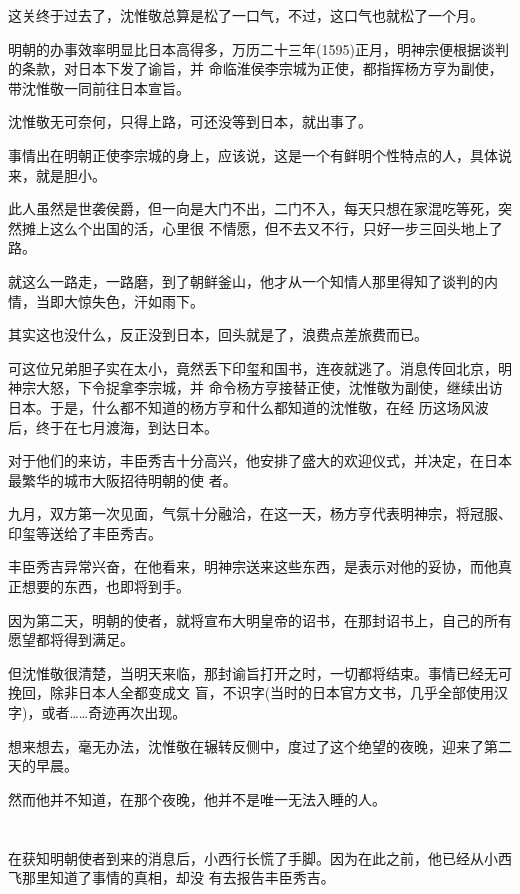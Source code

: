 \documentclass[11pt,a4paper,onecolumn]{article}
\begin{document}
这关终于过去了，沈惟敬总算是松了一口气，不过，这口气也就松了一个月。

明朝的办事效率明显比日本高得多，万历二十三年(1595)正月，明神宗便根据谈判的条款，对日本下发了谕旨，并
命临淮侯李宗城为正使，都指挥杨方亨为副使，带沈惟敬一同前往日本宣旨。

沈惟敬无可奈何，只得上路，可还没等到日本，就出事了。

事情出在明朝正使李宗城的身上，应该说，这是一个有鲜明个性特点的人，具体说来，就是胆小。

此人虽然是世袭侯爵，但一向是大门不出，二门不入，每天只想在家混吃等死，突然摊上这么个出国的活，心里很
不情愿，但不去又不行，只好一步三回头地上了路。

就这么一路走，一路磨，到了朝鲜釜山，他才从一个知情人那里得知了谈判的内情，当即大惊失色，汗如雨下。

其实这也没什么，反正没到日本，回头就是了，浪费点差旅费而已。

可这位兄弟胆子实在太小，竟然丢下印玺和国书，连夜就逃了。消息传回北京，明神宗大怒，下令捉拿李宗城，并
命令杨方亨接替正使，沈惟敬为副使，继续出访日本。于是，什么都不知道的杨方亨和什么都知道的沈惟敬，在经
历这场风波后，终于在七月渡海，到达日本。

对于他们的来访，丰臣秀吉十分高兴，他安排了盛大的欢迎仪式，并决定，在日本最繁华的城市大阪招待明朝的使
者。

九月，双方第一次见面，气氛十分融洽，在这一天，杨方亨代表明神宗，将冠服、印玺等送给了丰臣秀吉。

丰臣秀吉异常兴奋，在他看来，明神宗送来这些东西，是表示对他的妥协，而他真正想要的东西，也即将到手。

因为第二天，明朝的使者，就将宣布大明皇帝的诏书，在那封诏书上，自己的所有愿望都将得到满足。

但沈惟敬很清楚，当明天来临，那封谕旨打开之时，一切都将结束。事情已经无可挽回，除非日本人全都变成文
盲，不识字(当时的日本官方文书，几乎全部使用汉字)，或者……奇迹再次出现。

想来想去，毫无办法，沈惟敬在辗转反侧中，度过了这个绝望的夜晚，迎来了第二天的早晨。

然而他并不知道，在那个夜晚，他并不是唯一无法入睡的人。

\section[\thesection]{}

在获知明朝使者到来的消息后，小西行长慌了手脚。因为在此之前，他已经从小西飞那里知道了事情的真相，却没
有去报告丰臣秀吉。
\end{document}
